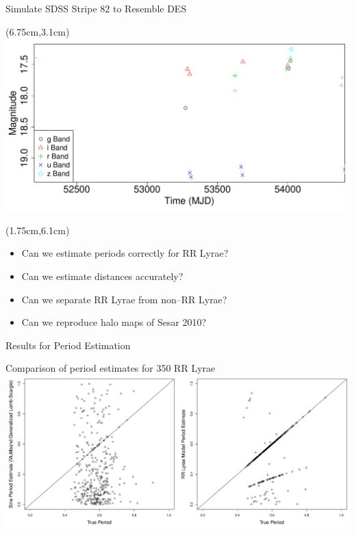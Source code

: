 \documentclass[12pt]{beamer}
\begin{document}
\begin{frame}{Simulate SDSS Stripe 82 to Resemble DES}
  \begin{textblock*}{3cm}(6.75cm,3.1cm) %
\includegraphics[scale=.15]{figs/unfolded_13350down.pdf}
\end{textblock*}

  \begin{textblock*}{12cm}(1.75cm,6.1cm) %
\begin{itemize}
\item Can we estimate periods correctly for RR Lyrae?
\item Can we estimate distances accurately?
\item Can we separate RR Lyrae from non--RR Lyrae? 
\item Can we reproduce halo maps of Sesar 2010?
\end{itemize}
\end{textblock*}

\end{frame}


\begin{frame}{Results for Period Estimation}



\begin{center}
Comparison of period estimates for 350 RR Lyrae\\
\includegraphics[scale=.25]{figs/period_comparison.pdf}
\end{center}



\end{frame}
\end{document}
